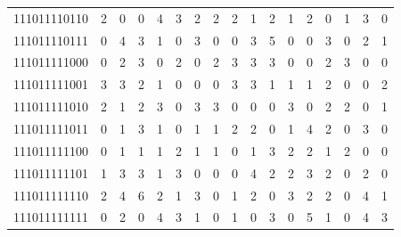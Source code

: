 \documentclass[10pt,a4paper]{article}
\begin{document}
\begin{longtable}{ |c|c|c|c|c|c|c|c|c|c|c|c|c|c|c|c|c| }
    111011110110              & 2                            & 0                                & 0                            & 4                              & 3   & 2   & 2   & 2   & 1   & 2   & 1   & 2   & 0   & 1   & 3   & 0   \\
    111011110111              & 0                            & 4                                & 3                            & 1                              & 0   & 3   & 0   & 0   & 3   & 5   & 0   & 0   & 3   & 0   & 2   & 1   \\
    111011111000              & 0                            & 2                                & 3                            & 0                              & 2   & 0   & 2   & 3   & 3   & 3   & 0   & 0   & 2   & 3   & 0   & 0   \\
    111011111001              & 3                            & 3                                & 2                            & 1                              & 0   & 0   & 0   & 3   & 3   & 1   & 1   & 1   & 2   & 0   & 0   & 2   \\
    111011111010              & 2                            & 1                                & 2                            & 3                              & 0   & 3   & 3   & 0   & 0   & 0   & 3   & 0   & 2   & 2   & 0   & 1   \\
    111011111011              & 0                            & 1                                & 3                            & 1                              & 0   & 1   & 1   & 2   & 2   & 0   & 1   & 4   & 2   & 0   & 3   & 0   \\
    111011111100              & 0                            & 1                                & 1                            & 1                              & 2   & 1   & 1   & 0   & 1   & 3   & 2   & 2   & 1   & 2   & 0   & 0   \\
    111011111101              & 1                            & 3                                & 3                            & 1                              & 3   & 0   & 0   & 0   & 4   & 2   & 2   & 3   & 2   & 0   & 2   & 0   \\
    111011111110              & 2                            & 4                                & 6                            & 2                              & 1   & 3   & 0   & 1   & 2   & 0   & 3   & 2   & 2   & 0   & 4   & 1   \\
    111011111111              & 0                            & 2                                & 0                            & 4                              & 3   & 1   & 0   & 1   & 0   & 3   & 0   & 5   & 1   & 0   & 4   & 3   \\

\end{longtable}
\end{document}
